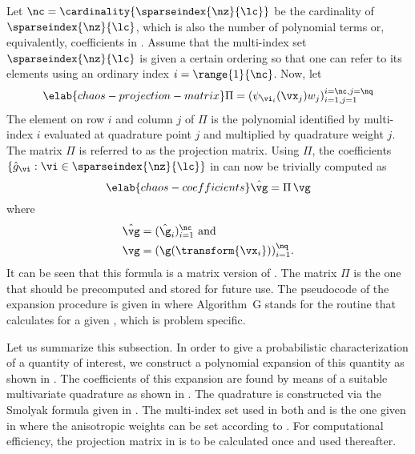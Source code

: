 Let $\nc = \cardinality{\sparseindex{\nz}{\lc}}$ be the cardinality of
$\sparseindex{\nz}{\lc}$, which is also the number of polynomial terms or,
equivalently, coefficients in . Assume that the
multi-index set $\sparseindex{\nz}{\lc}$ is given a certain ordering so that one
can refer to its elements using an ordinary index $i = \range{1}{\nc}$. Now, let
\begin{equation} \elab{chaos-projection-matrix}
  \Pi = (\psi_{\vi_i}(\vx_j) w_j)_{i = 1, j = 1}^{i = \nc, j = \nq}
\end{equation}
The element on row $i$ and column $j$ of $\Pi$ is the polynomial identified by
multi-index $i$ evaluated at quadrature point $j$ and multiplied by quadrature
weight $j$. The matrix $\Pi$ is referred to as the projection matrix. Using
$\Pi$, the coefficients $\{ \hat{g}_{\vi}: \vi \in \sparseindex{\nz}{\lc} \}$ in
 can now be trivially computed as
\begin{equation} \elab{chaos-coefficients}
  \hat{\vg} = \Pi \, \vg
\end{equation}
where
\begin{align*}
  & \hat{\vg} = (\hat{\g}_i)_{i = 1}^\nc \text{ and} \\
  & \vg = (\g(\transform{\vx_i}))_{i = 1}^\nq.
\end{align*}
It can be seen that this formula is a matrix version of
. The matrix $\Pi$ is the one that should be precomputed
and stored for future use. The pseudocode of the expansion procedure is given in
 where Algorithm~G stands for the routine that calculates
\g for a given \vu, which is problem specific.

Let us summarize this subsection. In order to give a probabilistic
characterization of a quantity of interest, we construct a polynomial expansion
of this quantity as shown in . The coefficients of this
expansion are found by means of a suitable multivariate quadrature as shown in
. The quadrature is constructed via the Smolyak formula
given in . The multi-index set used in both
 and  is the one given in
 where the anisotropic weights can be set
according to . For computational efficiency, the
projection matrix in  is to be calculated once and
used thereafter.

